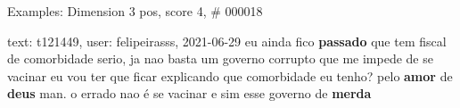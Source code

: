 \begin{frame}{Examples: Dimension 3 pos, score 4, \# 000018}
\footnotesize
\begin{exampleblock}{text: t121449, user: felipeirasss, 2021-06-29}
eu ainda fico \textbf{passado} que tem fiscal de comorbidade serio, ja nao 
basta um governo corrupto que me impede de se vacinar eu vou ter que ficar 
explicando que comorbidade eu tenho? pelo \textbf{amor} de \textbf{deus} man. o 
errado nao é se vacinar e sim esse governo de \textbf{merda} 
\end{exampleblock}
\end{frame}

